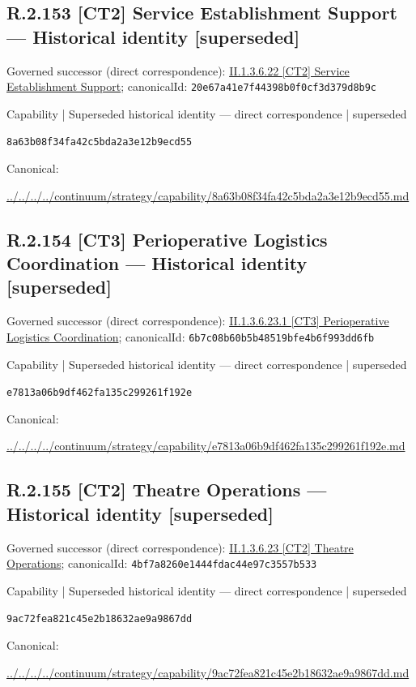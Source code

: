 \documentclass[10pt,a4paper]{article}
\begin{document}
\subsection*{R.2.153 [CT2] Service Establishment Support — Historical identity [superseded]}
Governed successor (direct correspondence): \hyperref[element-20e67a41e7f44398b0f0cf3d379d8b9c]{II.1.3.6.22 [CT2] Service Establishment Support}; canonicalId: \texttt{20e67a41e7f44398b0f0cf3d379d8b9c}\par
\label{element-8a63b08f34fa42c5bda2a3e12b9ecd55}
{\small Capability | Superseded historical identity — direct correspondence | superseded}\par
\texttt{8a63b08f34fa42c5bda2a3e12b9ecd55}\par
Canonical: \par
{\footnotesize\url{../../../../continuum/strategy/capability/8a63b08f34fa42c5bda2a3e12b9ecd55.md}}\par
\subsection*{R.2.154 [CT3] Perioperative Logistics Coordination — Historical identity [superseded]}
Governed successor (direct correspondence): \hyperref[element-6b7c08b60b5b48519bfe4b6f993dd6fb]{II.1.3.6.23.1 [CT3] Perioperative Logistics Coordination}; canonicalId: \texttt{6b7c08b60b5b48519bfe4b6f993dd6fb}\par
\label{element-e7813a06b9df462fa135c299261f192e}
{\small Capability | Superseded historical identity — direct correspondence | superseded}\par
\texttt{e7813a06b9df462fa135c299261f192e}\par
Canonical: \par
{\footnotesize\url{../../../../continuum/strategy/capability/e7813a06b9df462fa135c299261f192e.md}}\par
\subsection*{R.2.155 [CT2] Theatre Operations — Historical identity [superseded]}
Governed successor (direct correspondence): \hyperref[element-4bf7a8260e1444fdac44e97c3557b533]{II.1.3.6.23 [CT2] Theatre Operations}; canonicalId: \texttt{4bf7a8260e1444fdac44e97c3557b533}\par
\label{element-9ac72fea821c45e2b18632ae9a9867dd}
{\small Capability | Superseded historical identity — direct correspondence | superseded}\par
\texttt{9ac72fea821c45e2b18632ae9a9867dd}\par
Canonical: \par
{\footnotesize\url{../../../../continuum/strategy/capability/9ac72fea821c45e2b18632ae9a9867dd.md}}\par
\end{document}
